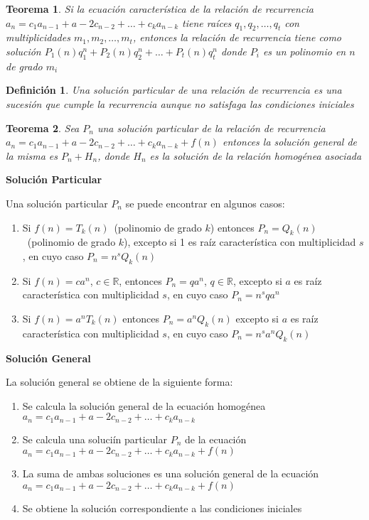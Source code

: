 \documentclass[a4paper,12pt]{report}
\newtheorem*{teo}{Teorema}
\newtheorem*{dfn}{Definición}
\begin{document}
\begin{teo}
 Si la ecuación característica de la relación de recurrencia\\ 
 $a_n=c_1a_{n-1}+a-2c_{n-2}+\dots+c_ka_{n-k}$ tiene raíces $q_1,q_2,\dots,q_t$ con multiplicidades $m_1, m_2,\dots, m_t$, entonces la relación de recurrencia tiene como solución
 $P_1(n)q^n_1+P_2(n)q^n_2+\dots+P_t(n)q^n_t$ donde $P_i$ es un polinomio en $n$ de grado $m_i $
\end{teo}

\begin{dfn}
 Una solución particular de una relación de recurrencia es una sucesión que cumple la recurrencia aunque no satisfaga las condiciones iniciales
\end{dfn}

\begin{teo}
 Sea $P_n$ una solución particular de la relación de recurrencia\\ 
 $a_n=c_1a_{n-1}+a-2c_{n-2}+\dots+c_ka_{n-k}+f(n)$ entonces la solución general de la misma es
 $P_n+H_n$, donde $H_n$ es la solución de la relación homogénea asociada
\end{teo}

\textbf{Solución Particular}

Una solución particular $P_n$ se puede encontrar en algunos casos:

\begin{enumerate}
 \item Si $f(n)=T_k(n)$~(polinomio de grado $k$) entonces $P_n=Q_k(n)$~(polinomio de grado $k$), excepto si 1 es raíz característica con multiplicidad $s$, en cuyo caso $P_n=n^sQ_k(n)$
 \item Si $f(n)=ca^n$, $c\in\mathbb{R}$, entonces $P_n=qa^n$, $q\in\mathbb{R}$, excepto si $a$ es raíz característica con multiplicidad $s$, en cuyo caso $P_n=n^sqa^n$
 \item Si $f(n)=a^nT_k(n)$ entonces $P_n=a^nQ_k(n)$ excepto si $a$ es raíz característica con multiplicidad $s$, en cuyo caso $P_n=n^sa^nQ_k(n)$

\end{enumerate}


\textbf{Solución General}

La solución general se obtiene de la siguiente forma:

\begin{enumerate}
 \item Se calcula la solución general de la ecuación homogénea\\ 
 $a_n=c_1a_{n-1}+a-2c_{n-2}+\dots+c_ka_{n-k}$ 
 \item Se calcula una soluciín particular $P_n$ de la ecuación\\ 
 $a_n=c_1a_{n-1}+a-2c_{n-2}+\dots+c_ka_{n-k}+f(n)$ 
 \item La suma de ambas soluciones es una solución general de la ecuación\\
 $a_n=c_1a_{n-1}+a-2c_{n-2}+\dots+c_ka_{n-k}+f(n)$ 
 \item Se obtiene la solución correspondiente a las condiciones iniciales
 \end{enumerate}
 
\end{document}
